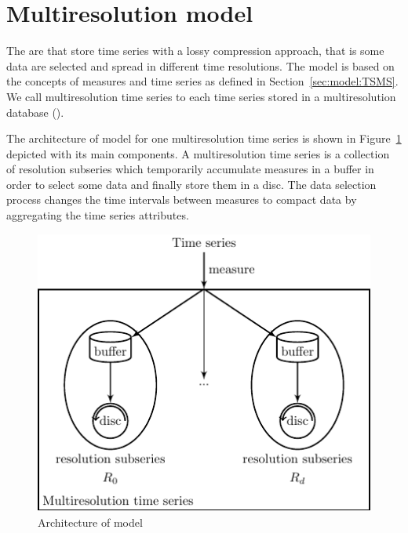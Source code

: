 




\section{Multiresolution model}
\label{sec:MTSMS}


The  are  that store time series with a lossy
compression approach, that is some data are selected and spread
in different time resolutions. The  model is based on the
concepts of measures and time series as defined in
Section~\ref{sec:model:TSMS}. We call multiresolution time series
to each time series stored in a multiresolution database
().


The architecture of  model for one multiresolution time series is
shown in Figure~\ref{fig:model:mtsdb} depicted with its main
components.  A multiresolution time series is a collection of
resolution subseries which temporarily accumulate measures in a buffer
in order to select some data and finally store them in a
disc. The data selection process changes the time intervals
between measures to compact data by aggregating the time series
attributes.

\begin{figure}
  \centering
  \includegraphics{fig_model_mtsdb.pdf}
  \caption{Architecture of  model}
  \label{fig:model:mtsdb}
\end{figure}



